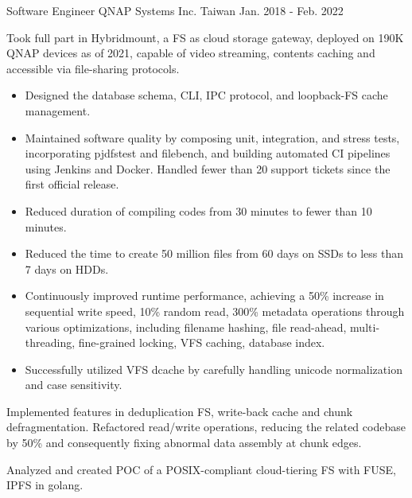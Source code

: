 \begin{cventries}
  \cventry
    {Software Engineer} %
    {QNAP Systems Inc.} %
    {Taiwan} %
    {Jan. 2018 - Feb. 2022} %
    {
      \begin{cvitems} %
        \item Took full part in Hybridmount, a FS as cloud storage gateway,
          deployed on 190K QNAP devices as of 2021, capable of video streaming,
          contents caching and accessible via file-sharing protocols.
        \begin{itemize}
          \item Designed the database schema, CLI, IPC protocol, and loopback-FS
            cache management.
          \item Maintained software quality by composing unit, integration, and
            stress tests, incorporating pjdfstest and filebench, and building
            automated CI pipelines using Jenkins and Docker. Handled fewer than
            20 support tickets since the first official release.
          \item Reduced duration of compiling codes from 30 minutes to fewer
            than 10 minutes.
          \item Reduced the time to create 50 million files from 60 days
            on SSDs to less than 7 days on HDDs.
          \item Continuously improved runtime performance, achieving a 50\%
            increase in sequential write speed, 10\% random read, 300\% metadata
            operations through various optimizations, including filename
            hashing, file read-ahead, multi-threading, fine-grained locking, VFS
            caching, database index.
          \item Successfully utilized VFS dcache by carefully handling unicode
            normalization and case sensitivity.
        \end{itemize}
        \item Implemented features in deduplication FS, write-back cache
          and chunk defragmentation. Refactored read/write operations, reducing
          the related codebase by 50\% and consequently fixing abnormal data
          assembly at chunk edges.
        \item Analyzed and created POC of a POSIX-compliant cloud-tiering FS
          with FUSE, IPFS in golang.
      \end{cvitems}
    }

\end{cventries}
